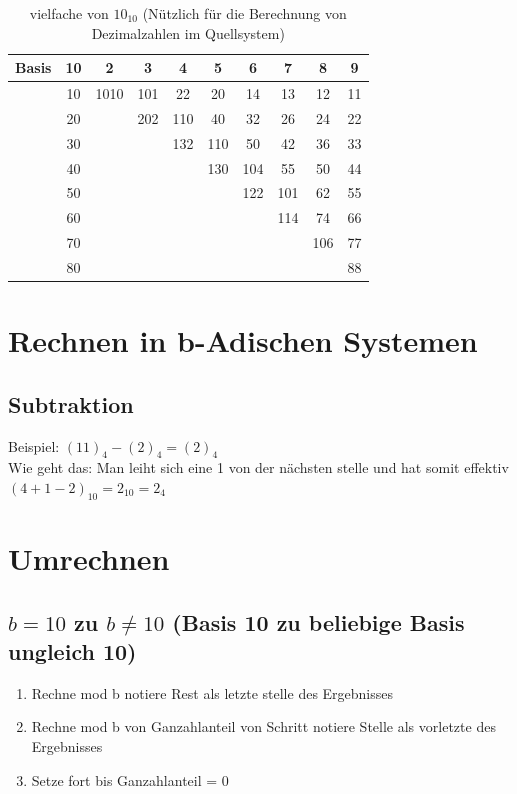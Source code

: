 \documentclass[a4paper]{article}
\begin{document}
	\begin{table}[H]
	\centering
	\caption{vielfache von $10_{10}$ (Nützlich für die Berechnung von Dezimalzahlen im Quellsystem)}
	\label{vielfacheVon10}
	\begin{tabular}{cc|c|c|c|c|c|c|c|c}
	Basis &10    & 2    & 3   & 4   & 5   & 6   & 7   & 8   & 9  \\\hline
	      &10    & 1010 & 101 & 22  & 20  & 14  & 13  & 12  & 11 \\\hline
	      &20    &      & 202 & 110 & 40  & 32  & 26  & 24  & 22 \\\hline
	      &30    &      &     & 132 & 110 & 50  & 42  & 36  & 33 \\\hline
	      &40    &      &     &     & 130 & 104 & 55  & 50  & 44 \\\hline
	      &50    &      &     &     &     & 122 & 101 & 62  & 55 \\\hline
	      &60    &      &     &     &     &     & 114 & 74  & 66 \\\hline
	      &70    &      &     &     &     &     &     & 106 & 77 \\\hline
	      &80    &      &     &     &     &     &     &     & 88
	\end{tabular}
	\end{table}

\section{Rechnen in b-Adischen Systemen}
	\subsection{Subtraktion}
		Beispiel: $(11)_4 - (2)_4 = (2)_4$\\Wie geht das: Man leiht sich eine 1 von der nächsten stelle und hat somit effektiv $(4+1-2)_{10} = 2_{10} = 2_{4}$
\section{Umrechnen}
	\subsection{\texorpdfstring{$b = 10$ zu $b \neq 10$ (Basis 10 zu beliebige Basis ungleich 10)}{Basis 10 zu b-adisch ungleich 10}}
		\begin{enumerate}
			\item Rechne mod b notiere Rest als letzte stelle des Ergebnisses
			\item Rechne mod b von Ganzahlanteil von Schritt notiere Stelle als vorletzte des Ergebnisses
			\item Setze fort bis Ganzahlanteil = 0
		\end{enumerate}
\end{document}
